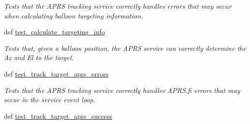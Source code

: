\begin{DoxyCompactItemize}
\begin{DoxyCompactList}\small\item\em Tests that the A\-P\-R\-S tracking service correctly handles errors that may occur when calculating balloon targeting information. \end{DoxyCompactList}\item 
\hypertarget{classhwm_1_1hardware_1_1devices_1_1drivers_1_1mxl__balloon__tracker_1_1tests_1_1test__mxl__ballo85cb9f09344d47402c35803686488a42_a01778e8e192468a0271fa8835734c101}{def \hyperlink{classhwm_1_1hardware_1_1devices_1_1drivers_1_1mxl__balloon__tracker_1_1tests_1_1test__mxl__ballo85cb9f09344d47402c35803686488a42_a01778e8e192468a0271fa8835734c101}{test\-\_\-calculate\-\_\-targeting\-\_\-info}}\label{classhwm_1_1hardware_1_1devices_1_1drivers_1_1mxl__balloon__tracker_1_1tests_1_1test__mxl__ballo85cb9f09344d47402c35803686488a42_a01778e8e192468a0271fa8835734c101}

\begin{DoxyCompactList}\small\item\em Tests that, given a balloon position, the A\-P\-R\-S service can correctly determine the Az and El to the target. \end{DoxyCompactList}\item 
\hypertarget{classhwm_1_1hardware_1_1devices_1_1drivers_1_1mxl__balloon__tracker_1_1tests_1_1test__mxl__ballo85cb9f09344d47402c35803686488a42_a8bdc65df28b3f3fa18e4171065d6e280}{def \hyperlink{classhwm_1_1hardware_1_1devices_1_1drivers_1_1mxl__balloon__tracker_1_1tests_1_1test__mxl__ballo85cb9f09344d47402c35803686488a42_a8bdc65df28b3f3fa18e4171065d6e280}{test\-\_\-track\-\_\-target\-\_\-aprs\-\_\-errors}}\label{classhwm_1_1hardware_1_1devices_1_1drivers_1_1mxl__balloon__tracker_1_1tests_1_1test__mxl__ballo85cb9f09344d47402c35803686488a42_a8bdc65df28b3f3fa18e4171065d6e280}

\begin{DoxyCompactList}\small\item\em Tests that the A\-P\-R\-S tracking service correctly handles A\-P\-R\-S.\-fi errors that may occur in the service event loop. \end{DoxyCompactList}\item 
\hypertarget{classhwm_1_1hardware_1_1devices_1_1drivers_1_1mxl__balloon__tracker_1_1tests_1_1test__mxl__ballo85cb9f09344d47402c35803686488a42_a1b90ca9f537a32f87f3d028b6bade99f}{def \hyperlink{classhwm_1_1hardware_1_1devices_1_1drivers_1_1mxl__balloon__tracker_1_1tests_1_1test__mxl__ballo85cb9f09344d47402c35803686488a42_a1b90ca9f537a32f87f3d028b6bade99f}{test\-\_\-track\-\_\-target\-\_\-aprs\-\_\-success}}\label{classhwm_1_1hardware_1_1devices_1_1drivers_1_1mxl__balloon__tracker_1_1tests_1_1test__mxl__ballo85cb9f09344d47402c35803686488a42_a1b90ca9f537a32f87f3d028b6bade99f}


\end{DoxyCompactItemize}
